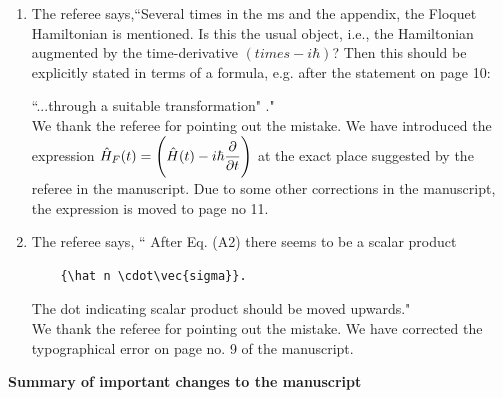 \documentclass[aps,prb,reprint,showpacs,floatfix,superscriptaddress, onecolumn, 9pt]{revtex4-2}
\newcommand{\ar}[1]{{\color{blue}#1}} %
\begin{document}
\begin{enumerate}
    \item The referee says,``Several times in the ms and the appendix, the Floquet Hamiltonian is mentioned. Is this the usual object, i.e., the Hamiltonian augmented by the time-derivative $(times -i\hbar)$? Then this should be explicitly stated in terms of a formula, e.g. after the statement on page 10:

    ``...through a suitable transformation" ."\\

    \ar{
    We thank the referee for pointing out the mistake. We have introduced the expression $\displaystyle \hat{H}_F(t) = \Bigg(\hat{H}(t) - i\hbar \pdv{t}\Bigg)$ at the exact place suggested by the referee in the manuscript. Due to some other corrections in the manuscript, the expression is moved to page no 11.
    }
    \item The referee says, `` After Eq. (A2) there seems to be a scalar product \begin{verbatim}
    {\hat n \cdot\vec{sigma}}.
    \end{verbatim} The dot indicating scalar product should be moved upwards."\\

    \ar{
    We thank the referee for pointing out the mistake. We have corrected the typographical error on page no. 9 of the manuscript.
    }
\end{enumerate}
\vskip 1cm 
\noindent \textbf{Summary of important changes to the  manuscript}
\end{document}
